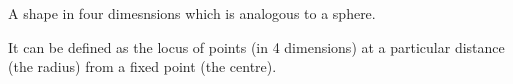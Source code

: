 A shape in four dimesnsions which is analogous to a sphere.
\par
It can be defined as the locus of points (in 4 dimensions)
at a particular distance (the radius) from a fixed point (the centre).